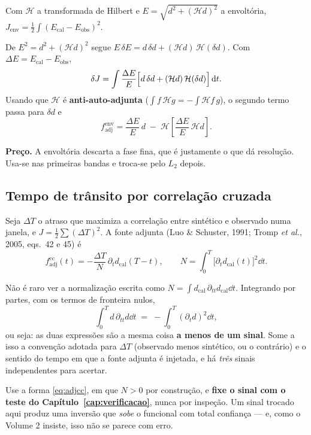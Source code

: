 \documentclass[11pt,a4paper,oneside]{report}
\begin{document}
Com $\mathcal{H}$ a transformada de Hilbert e
$E = \sqrt{d^{2} + (\mathcal{H}d)^{2}}$ a envolt\'oria,
$J_{\text{env}} = \tfrac12\int (E_{\text{cal}} - E_{\text{obs}})^{2}$.

\begin{derivacao}
De $E^{2} = d^{2}+(\mathcal{H}d)^{2}$ segue
$E\,\delta E = d\,\delta d + (\mathcal{H}d)\,\mathcal{H}(\delta d)$. Com
$\Delta E = E_{\text{cal}}-E_{\text{obs}}$,
\[
\delta J = \int \frac{\Delta E}{E}\Bigl[d\,\delta d
 + (\mathcal{H}d)\,\mathcal{H}(\delta d)\Bigr]\,\mathrm{d} t .
\]
Usando que $\mathcal{H}$ \'e \textbf{anti-auto-adjunta}
($\int f\,\mathcal{H}g = -\int \mathcal{H}f\,g$), o segundo termo passa para
$\delta d$ e
\begin{equation}
f_{\text{adj}}^{\text{env}}
 = \frac{\Delta E}{E}\,d
 \;-\; \mathcal{H}\!\left[\frac{\Delta E}{E}\,\mathcal{H}d\right].
\end{equation}
\end{derivacao}

\textbf{Pre\c{c}o.} A envolt\'oria descarta a fase fina, que \'e justamente o
que d\'a resolu\c{c}\~ao. Usa-se nas primeiras bandas e troca-se pelo $L_2$
depois.

\subsection*{Tempo de tr\^ansito por correla\c{c}\~ao cruzada}

Seja $\Delta T$ o atraso que maximiza a correla\c{c}\~ao entre sint\'etico e
observado numa janela, e $J = \tfrac12\sum (\Delta T)^{2}$. A fonte adjunta
(Luo \& Schuster, 1991; Tromp \emph{et al.}, 2005, eqs.~42 e 45) \'e
\begin{equation}
f_{\text{adj}}^{\text{cc}}(t) = -\frac{\Delta T}{N}\,
  \partial_t d_{\text{cal}}(T-t),
\qquad
N = \int_0^T \bigl[\partial_t d_{\text{cal}}(t)\bigr]^{2}\dd t .
\label{eq:adjcc}
\end{equation}

\begin{armadilha}
N\~ao \'e raro ver a normaliza\c{c}\~ao escrita como
$N = \int d_{\text{cal}}\,\partial_{tt}d_{\text{cal}}\dd t$. Integrando por
partes, com os termos de fronteira nulos,
\[
\int_0^T d\,\partial_{tt}d \dd t \;=\; -\int_0^T (\partial_t d)^{2}\dd t ,
\]
ou seja: as duas express\~oes s\~ao a mesma coisa \textbf{a menos de um
sinal}. Some a isso a conven\c{c}\~ao adotada para $\Delta T$ (observado menos
sint\'etico, ou o contr\'ario) e o sentido do tempo em que a fonte adjunta \'e
injetada, e h\'a \emph{tr\^es} sinais independentes para acertar.

Use a forma \eqref{eq:adjcc}, em que $N > 0$ por constru\c{c}\~ao, e
\textbf{fixe o sinal com o teste do Cap\'itulo~\ref{cap:verificacao}}, nunca
por inspe\c{c}\~ao. Um sinal trocado aqui produz uma invers\~ao que
\emph{sobe} o funcional com total confian\c{c}a --- e, como o Volume 2
insiste, isso n\~ao se parece com erro.
\end{armadilha}
\end{document}
